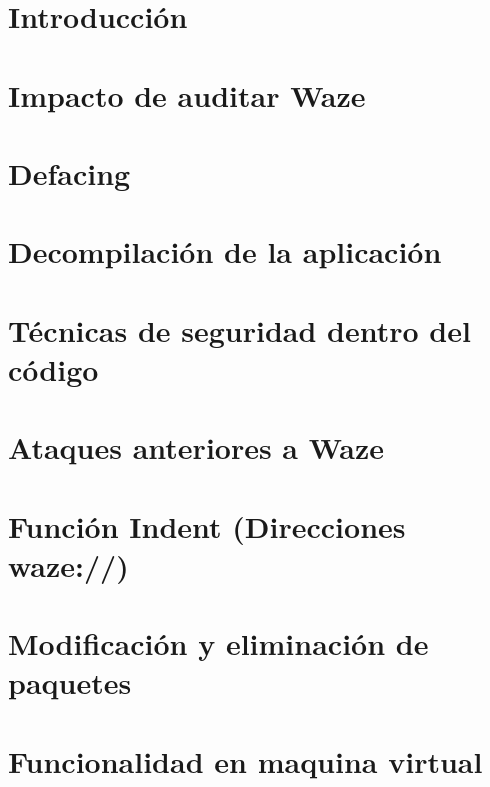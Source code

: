 \documentclass[12pt]{article}
\begin{document}

\tableofcontents
\newpage 

\listoffigures
\newpage



\section{Introducción}


\newpage

\section{Impacto de auditar Waze}


\section{Defacing}


\section{Decompilación de la aplicación}



\section{Técnicas de seguridad dentro del código}


\section{Ataques anteriores a Waze}


\section{Función Indent (Direcciones waze://)}


\section{Modificación y eliminación de paquetes}


\section{Funcionalidad en maquina virtual}

\end{document}
